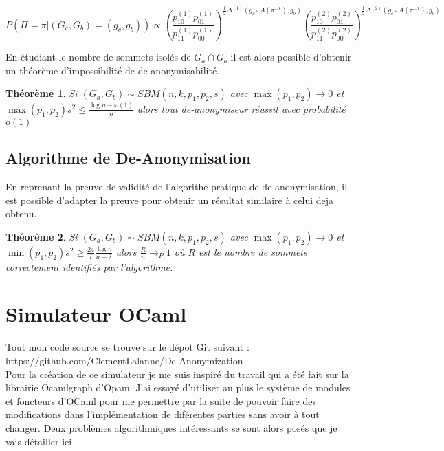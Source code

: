 \documentclass[letterpaper,10pt]{llncs}
\newtheorem{theoreme}{Théorème}
\begin{document}
\[
P(\Pi = \pi|(G_c,G_b) = (g_c,g_b)) \propto (\frac{p_{10}^{(1)}p_{01}^{(1)}}{p_{11}^{(1)}p_{00}^{(1)}})^{\frac{1}{2} \Delta^{(1)}(g_c \circ A(\pi^{-1}), g_b)}(\frac{p_{10}^{(2)}p_{01}^{(2)}}{p_{11}^{(2)}p_{00}^{(2)}})^{\frac{1}{2} \Delta^{(2)}(g_c \circ A(\pi^{-1}), g_b)}
\]

En étudiant le nombre de sommets isolés de $G_a \cap G_b$ il est alors possible d'obtenir un théorème d'impossibilité de de-anonymisabilité.

\begin{theoreme}
Si $(G_a,G_b) \sim SBM(n,k,p_1,p_2,s)$ avec $\max(p_1,p_2) \rightarrow 0$ et $\max(p_1,p_2)s^2 \leq \frac{\log n - \omega(1)}{n}$ alors tout de-anonymiseur réussit avec probabilité $o(1)$
\end{theoreme}

\subsection{Algorithme de De-Anonymisation}

En reprenant la preuve de validité de l'algorithe pratique de de-anonymisation, il est possible d'adapter la preuve pour obtenir un résultat similaire à celui deja obtenu.

\begin{theoreme}
Si $(G_a,G_b) \sim SBM(n,k,p_1,p_2,s)$ avec $\max(p_1,p_2) \rightarrow 0$ et $\min(p_1,p_2)s^2 \geq \frac{24}{l} \frac{\log n}{n-2}$ alors $\frac{R}{n} \rightarrow_{P} 1$ où $R$ est le nombre de sommets correctement identifiés par l'algorithme.

\end{theoreme}

\section{Simulateur OCaml}

Tout mon code source se trouve sur le dépot Git suivant : \\
https://github.com/ClementLalanne/De-Anonymization\\
Pour la création de ce simulateur je me suis inspiré du travail qui a été fait sur la librairie Ocamlgraph d'Opam. J'ai essayé d'utiliser au plus le système de modules et foncteurs d'OCaml pour me permettre par la suite de pouvoir faire des modifications dans l'implémentation de diférentes parties sans avoir à tout changer. Deux problèmes algorithmiques intéressants se sont alors posés que je vais détailler ici
\end{document}
